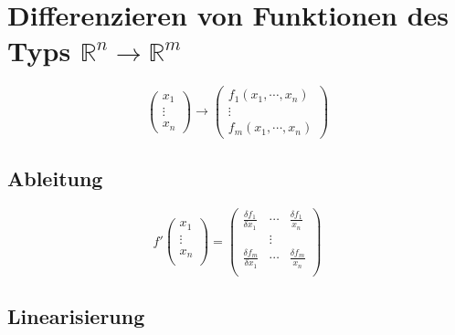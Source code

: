 \section{Differenzieren von Funktionen des Typs $\mathbb{R}^n \rightarrow \mathbb{R}^m$}
\begin{displaymath}
	\begin{pmatrix}
		x_1 \\
		\vdots \\
		x_n
	\end{pmatrix}
	\rightarrow
	\begin{pmatrix}
		f_1(x_1,\cdots , x_n) \\
		\vdots \\
		f_m(x_1,\cdots , x_n)
	\end{pmatrix}
\end{displaymath}

\subsection{Ableitung}
\begin{displaymath}
	f'
	\begin{pmatrix}
		x_1 \\
		\vdots \\
		x_n \\
	\end{pmatrix}
	=
	\begin{pmatrix}
		\frac{\delta f_1}{\delta x_1} & \cdots & \frac{\delta f_1}{x_n} \\
		& \vdots & \\
		\frac{\delta f_m}{\delta x_1} & \cdots & \frac{\delta f_m}{x_n} \\
	\end{pmatrix}
\end{displaymath}

\subsection{Linearisierung}
